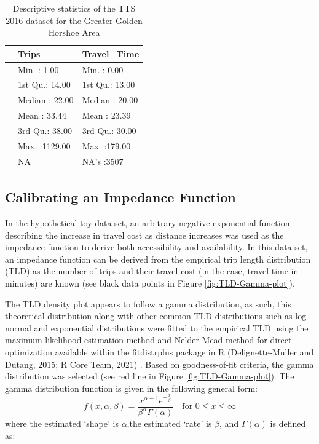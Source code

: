\documentclass[]{elsarticle} %
\begin{document}
\begin{table}

\caption{\label{tab:unnamed-chunk-1}\label{tab:TTS-16-desc-stats}Descriptive statistics of the TTS 2016 dataset for the Greater Golden Horshoe Area}
\centering
\begin{tabular}[t]{l|l|l}
\hline
  & Trips & Travel\_Time\\
\hline
 & Min.   :   1.00 & Min.   :  0.00\\
\hline
 & 1st Qu.:  14.00 & 1st Qu.: 13.00\\
\hline
 & Median :  22.00 & Median : 20.00\\
\hline
 & Mean   :  33.44 & Mean   : 23.39\\
\hline
 & 3rd Qu.:  38.00 & 3rd Qu.: 30.00\\
\hline
 & Max.   :1129.00 & Max.   :179.00\\
\hline
 & NA & NA's   :3507\\
\hline
\end{tabular}
\end{table}

\hypertarget{calibrating-an-impedance-function}{%
\subsection{Calibrating an Impedance
Function}\label{calibrating-an-impedance-function}}

In the hypothetical toy data set, an arbitrary negative exponential
function describing the increase in travel cost as distance increases
was used as the impedance function to derive both accessibility and
availability. In this data set, an impedance function can be derived
from the empirical trip length distribution (TLD) as the number of trips
and their travel cost (in the case, travel time in minutes) are known
(see black data points in Figure \ref{fig:TLD-Gamma-plot}).

The TLD density plot appears to follow a gamma distribution, as such,
this theoretical distribution along with other common TLD distributions
such as log-normal and exponential distributions were fitted to the
empirical TLD using the maximum likelihood estimation method and
Nelder-Mead method for direct optimization available within the
fitdistrplus package in R (Delignette-Muller and Dutang, 2015; R Core
Team, 2021) . Based on goodness-of-fit criteria, the gamma distribution
was selected (see red line in Figure \ref{fig:TLD-Gamma-plot}). The
gamma distribution function is given in the following general form: \[ 
f(x, \alpha, \beta) = \frac {x^{\alpha-1}e^{-\frac{x}{\beta}}}{ \beta^{\alpha}\Gamma(\alpha)} \quad \text{for } 0 \leq x \leq \infty
\] \noindent where the estimated `shape' is \(\alpha\),the estimated
`rate' is \(\beta\), and \(\Gamma(\alpha)\) is defined as:
\end{document}
